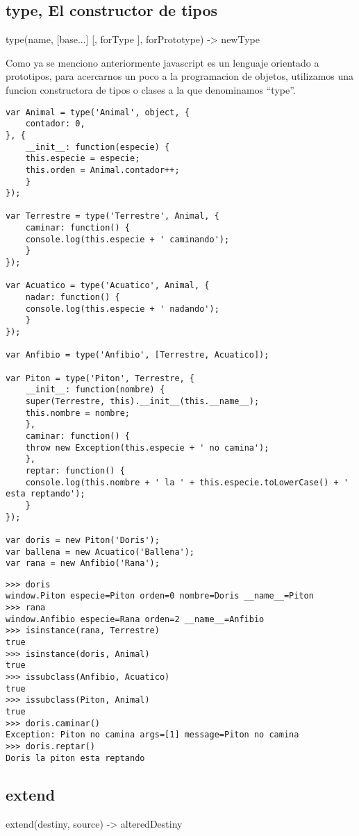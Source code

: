 {{{{{{{{\subsection*{type, El constructor de tipos}
type(name, [base...] [, forType ], forPrototype) -> newType

Como ya se menciono anteriormente javascript es un lenguaje orientado a prototipos, para acercarnos un poco a la programacion
de objetos, utilizamos una funcion constructora de tipos o clases a la que denominamos “type”.
\begin{lstlisting}[style=javascript,label=definicion-de-tipos,caption=Definicion de tipos]
var Animal = type('Animal', object, {
    contador: 0,
}, {
    __init__: function(especie) {
	this.especie = especie;
	this.orden = Animal.contador++;
    }
});

var Terrestre = type('Terrestre', Animal, {
    caminar: function() {
	console.log(this.especie + ' caminando');
    }
});

var Acuatico = type('Acuatico', Animal, {
    nadar: function() {
	console.log(this.especie + ' nadando');
    }
});

var Anfibio = type('Anfibio', [Terrestre, Acuatico]);

var Piton = type('Piton', Terrestre, {
    __init__: function(nombre) {
	super(Terrestre, this).__init__(this.__name__);
	this.nombre = nombre;
    },
    caminar: function() {
	throw new Exception(this.especie + ' no camina');
    },
    reptar: function() {
	console.log(this.nombre + ' la ' + this.especie.toLowerCase() + ' esta reptando');
    }
});

var doris = new Piton('Doris');
var ballena = new Acuatico('Ballena');
var rana = new Anfibio('Rana');
\end{lstlisting}

\begin{lstlisting}[style=consola,label=definicion-de-tipos-test,caption=Test]
>>> doris
window.Piton especie=Piton orden=0 nombre=Doris __name__=Piton
>>> rana
window.Anfibio especie=Rana orden=2 __name__=Anfibio
>>> isinstance(rana, Terrestre)
true
>>> isinstance(doris, Animal)
true
>>> issubclass(Anfibio, Acuatico)
true
>>> issubclass(Piton, Animal)
true
>>> doris.caminar()
Exception: Piton no camina args=[1] message=Piton no camina
>>> doris.reptar()
Doris la piton esta reptando
\end{lstlisting}

\subsection*{extend}
extend(destiny, source) -> alteredDestiny
}}}}}}}}

